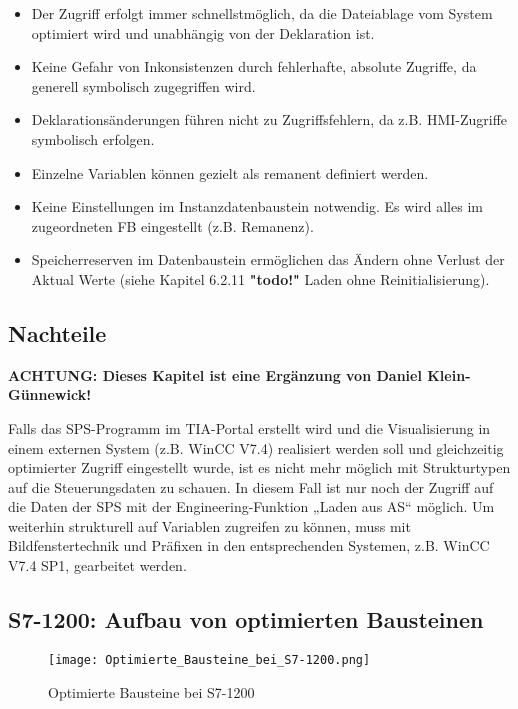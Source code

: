 \begin{itemize}
    \item Der Zugriff erfolgt immer schnellstmöglich, da die Dateiablage vom System optimiert wird und unabhängig von der Deklaration ist.
    \item Keine Gefahr von Inkonsistenzen durch fehlerhafte, absolute Zugriffe, da generell symbolisch zugegriffen wird.
    \item Deklarationsänderungen führen nicht zu Zugriffsfehlern, da z.B. HMI-Zugriffe symbolisch erfolgen. 
    \item Einzelne Variablen können gezielt als remanent definiert werden.
    \item Keine Einstellungen im Instanzdatenbaustein notwendig. Es wird alles im zugeordneten FB eingestellt (z.B. Remanenz).
    \item Speicherreserven im Datenbaustein ermöglichen das Ändern ohne Verlust der Aktual Werte (siehe Kapitel 6.2.11 \textbf{"todo!"} Laden ohne Reinitialisierung).
\end{itemize}


\subsection{Nachteile}\label{subsec:Nachteile}
\textbf{ACHTUNG: Dieses Kapitel ist eine Ergänzung von Daniel Klein-Günnewick!}\par
\noindent Falls das SPS-Programm im TIA-Portal erstellt wird und die Visualisierung in einem externen System (z.B. WinCC V7.4) realisiert werden soll und gleichzeitig optimierter Zugriff eingestellt wurde, ist es nicht mehr möglich mit Strukturtypen auf die Steuerungsdaten zu schauen. In diesem Fall ist nur noch der Zugriff auf die Daten der SPS mit der Engineering-Funktion „Laden aus AS“  möglich. Um weiterhin strukturell auf Variablen zugreifen zu können, muss mit Bildfenstertechnik und Präfixen in den entsprechenden Systemen, z.B. WinCC V7.4 SP1, gearbeitet werden.
\clearpage

\subsection{S7-1200: Aufbau von optimierten Bausteinen}\label{subsec:S7-1200: Aufbau von optimierten Bausteinen}
\begin{figure}[!ht]
    \centering
    \texttt{[image: Optimierte\_Bausteine\_bei\_S7-1200.png]}
    \caption{Optimierte Bausteine bei S7-1200}
    \label{fig:Optimierte Bausteine bei S7-1200}
\end{figure}

